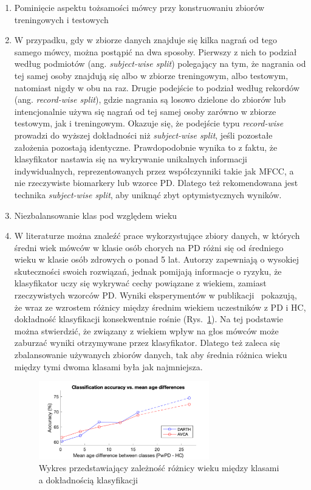 \begin{enumerate}[label={\alph*)}]
	\item Pominięcie aspektu tożsamości mówcy przy konstruowaniu zbiorów treningowych i testowych
	\item[] W przypadku, gdy w zbiorze danych znajduje się kilka nagrań od tego samego mówcy, można postąpić na dwa sposoby.
Pierwszy z nich to podział według podmiotów (ang. \emph{subject-wise split}) polegający na tym, że nagrania od tej samej
osoby znajdują się albo w zbiorze treningowym, albo testowym, natomiast nigdy w obu na raz.
Drugie podejście to podział według rekordów (ang. \emph{record-wise split}), gdzie nagrania są losowo dzielone do zbiorów
lub intencjonalnie używa się nagrań od tej samej osoby zarówno w zbiorze testowym, jak i treningowym.
Okazuje się, że podejście typu \emph{record-wise} prowadzi do wyższej dokładności niż \emph{subject-wise split}, jeśli pozostałe założenia pozostają identyczne.
Prawdopodobnie wynika to z faktu, że klasyfikator nastawia się na wykrywanie unikalnych informacji indywidualnych,
reprezentowanych przez współczynniki takie jak MFCC, a nie rzeczywiste biomarkery lub wzorce PD\@.
Dlatego też rekomendowana jest technika \emph{subject-wise split}, aby uniknąć zbyt optymistycznych wyników.

  	\item Niezbalansowanie klas pod względem wieku
	\item[] W literaturze można znaleźć prace wykorzystujące zbiory danych, w których średni wiek mówców
w klasie osób chorych na PD różni się od średniego wieku w klasie osób zdrowych o ponad 5 lat.
Autorzy zapewniają o wysokiej skuteczności swoich rozwiązań, jednak pomijają informacje o ryzyku, że klasyfikator
uczy się wykrywać cechy powiązane z wiekiem, zamiast rzeczywistych wzorców PD\@.
Wyniki eksperymentów w publikacji~\cite{SustainedVowelsProblems} pokazują, że wraz ze wzrostem różnicy między średnim wiekiem uczestników z PD i HC,
dokładność klasyfikacji konsekwentnie rośnie (Rys.~\ref{fig:acc_and_age_diff}).
Na tej podstawie można stwierdzić, że związany z wiekiem wpływ na głos mówców może zaburzać wyniki otrzymywane przez klasyfikator.
Dlatego też zaleca się zbalansowanie używanych zbiorów danych, tak aby średnia różnica wieku między tymi dwoma klasami była jak najmniejsza.


\begin{figure}[htbp]
	\centering
	\includegraphics[width=0.7\textwidth]{./img/acc_and_age_difference}
	\caption{Wykres przedstawiający zależność różnicy wieku między klasami a dokładnością klasyfikacji~\cite {SustainedVowelsProblems}}
    \label{fig:acc_and_age_diff}
\end{figure}


\end{enumerate}
